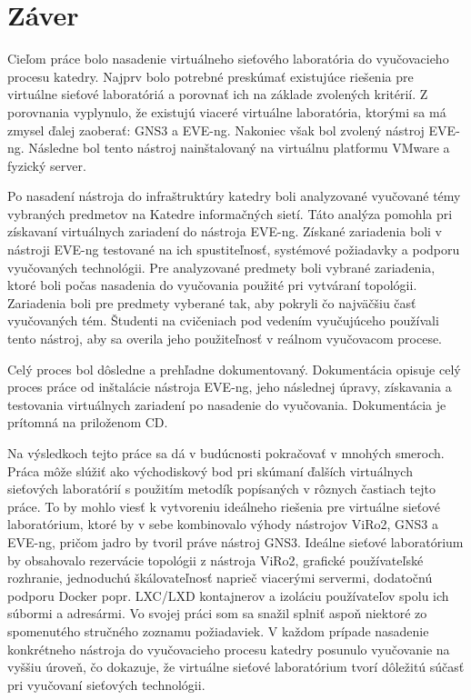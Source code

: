 \chapter{Záver}

Cieľom práce bolo nasadenie virtuálneho sieťového laboratória do vyučovacieho procesu katedry. Najprv bolo potrebné preskúmať existujúce riešenia pre virtuálne sieťové laboratóriá a porovnať ich na základe zvolených kritérií. Z porovnania vyplynulo, že existujú viaceré virtuálne laboratória, ktorými sa má zmysel ďalej zaoberať: GNS3 a EVE-ng. Nakoniec však bol zvolený nástroj EVE-ng. Následne bol tento nástroj nainštalovaný na virtuálnu platformu VMware a fyzický server.

Po nasadení nástroja do infraštruktúry katedry boli analyzované vyučované témy vybraných predmetov na Katedre informačných sietí. Táto analýza pomohla pri získavaní virtuálnych zariadení do nástroja EVE-ng. Získané zariadenia boli v nástroji EVE-ng testované na ich spustiteľnosť, systémové požiadavky a podporu vyučovaných technológii. Pre analyzované predmety boli vybrané zariadenia, ktoré boli počas nasadenia do vyučovania použité pri vytváraní topológii. Zariadenia boli pre predmety vyberané tak, aby pokryli čo najväčšiu časť vyučovaných tém. Študenti na cvičeniach pod vedením vyučujúceho používali tento nástroj, aby sa overila jeho použiteľnosť v reálnom vyučovacom procese.

Celý proces bol dôsledne a prehľadne dokumentovaný. Dokumentácia opisuje celý proces práce od inštalácie nástroja EVE-ng, jeho následnej úpravy, získavania a testovania virtuálnych zariadení po nasadenie do vyučovania. Dokumentácia je prítomná na priloženom CD.

Na výsledkoch tejto práce sa dá v budúcnosti pokračovať v mnohých smeroch. Práca môže slúžiť ako východiskový bod pri skúmaní ďalších virtuálnych sieťových laboratórií s použitím metodík popísaných v rôznych častiach tejto práce. To by mohlo viesť k vytvoreniu ideálneho riešenia pre virtuálne sieťové laboratórium, ktoré by v sebe kombinovalo výhody nástrojov ViRo2, GNS3 a EVE-ng, pričom jadro by tvoril práve nástroj GNS3. Ideálne sieťové laboratórium by obsahovalo rezervácie topológii z nástroja ViRo2, grafické používateľské rozhranie, jednoduchú škálovateľnosť naprieč viacerými servermi, dodatočnú podporu Docker popr. LXC/LXD kontajnerov a izoláciu používateľov spolu ich súbormi a adresármi. Vo svojej práci som sa snažil splniť aspoň niektoré zo spomenutého stručného zoznamu požiadaviek. V každom prípade nasadenie konkrétneho nástroja do vyučovacieho procesu katedry posunulo vyučovanie na vyššiu úroveň, čo dokazuje, že virtuálne sieťové laboratórium tvorí dôležitú súčasť pri vyučovaní sieťových technológii.